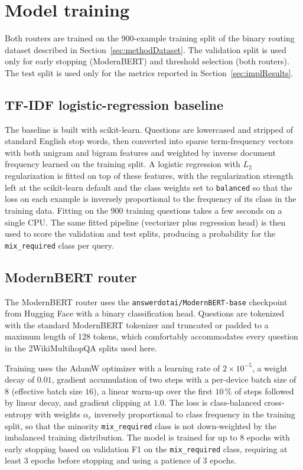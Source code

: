 \documentclass[english, bibtex]{kththesis}               %
\numberwithin{listing}{chapter}
\begin{document}
\section{Model training}
\label{sec:implTraining}

Both routers are trained on the 900-example training split of the binary routing dataset described in Section~\ref{sec:methodDataset}. The validation split is used only for early stopping (ModernBERT) and threshold selection (both routers). The test split is used only for the metrics reported in Section~\ref{sec:implResults}.

\subsection{TF-IDF logistic-regression baseline}
\label{sec:implTfidf}

The baseline is built with scikit-learn. Questions are lowercased and stripped of standard English stop words, then converted into sparse term-frequency vectors with both unigram and bigram features and weighted by inverse document frequency learned on the training split. A logistic regression with $L_2$ regularization is fitted on top of these features, with the regularization strength left at the scikit-learn default and the class weights set to \texttt{balanced} so that the loss on each example is inversely proportional to the frequency of its class in the training data. Fitting on the 900 training questions takes a few seconds on a single CPU. The same fitted pipeline (vectorizer plus regression head) is then used to score the validation and test splits, producing a probability for the \texttt{mix\_required} class per query.

\subsection{ModernBERT router}
\label{sec:implModernBert}

The ModernBERT router uses the \texttt{answerdotai/ModernBERT-base} checkpoint from Hugging Face \cite{warner2024modernbert} with a binary classification head. Questions are tokenized with the standard ModernBERT tokenizer and truncated or padded to a maximum length of 128 tokens, which comfortably accommodates every question in the 2WikiMultihopQA splits used here.

Training uses the AdamW optimizer \cite{loshchilov2019decoupled} with a learning rate of $2 \times 10^{-5}$, a weight decay of $0.01$, gradient accumulation of two steps with a per-device batch size of $8$ (effective batch size $16$), a linear warm-up over the first $10\,\%$ of steps followed by linear decay, and gradient clipping at $1.0$. The loss is class-balanced cross-entropy with weights $\alpha_c$ inversely proportional to class frequency in the training split, so that the minority \texttt{mix\_required} class is not down-weighted by the imbalanced training distribution. The model is trained for up to $8$ epochs with early stopping based on validation F1 on the \texttt{mix\_required} class, requiring at least $3$ epochs before stopping and using a patience of $3$ epochs.
\end{document}
